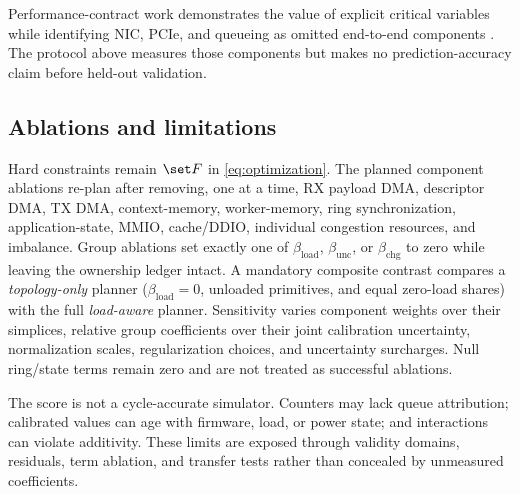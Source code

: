 Performance-contract work demonstrates the value of explicit critical variables while identifying NIC, PCIe, and queueing as omitted end-to-end components \cite{iyer2019contracts}. The protocol above measures those components but makes no prediction-accuracy claim before held-out validation.

\subsection{Ablations and limitations}

Hard constraints remain $\set F$ in \cref{eq:optimization}. The planned component ablations re-plan after removing, one at a time, RX payload DMA, descriptor DMA, TX DMA, context-memory, worker-memory, ring synchronization, application-state, MMIO, cache/DDIO, individual congestion resources, and imbalance. Group ablations set exactly one of $\beta_{\mathrm{load}}$, $\beta_{\mathrm{unc}}$, or $\beta_{\mathrm{chg}}$ to zero while leaving the ownership ledger intact. A mandatory composite contrast compares a \emph{topology-only} planner ($\beta_{\mathrm{load}}=0$, unloaded primitives, and equal zero-load shares) with the full \emph{load-aware} planner. Sensitivity varies component weights over their simplices, relative group coefficients over their joint calibration uncertainty, normalization scales, regularization choices, and uncertainty surcharges. Null ring/state terms remain zero and are not treated as successful ablations.

The score is not a cycle-accurate simulator. Counters may lack queue attribution; calibrated values can age with firmware, load, or power state; and interactions can violate additivity. These limits are exposed through validity domains, residuals, term ablation, and transfer tests rather than concealed by unmeasured coefficients.

